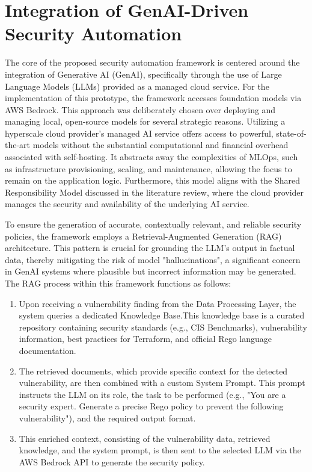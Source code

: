 

\section{Integration of GenAI-Driven Security Automation} %
\label{sub:Integration of GenAI-Driven Security Automation}

The core of the proposed security automation framework is centered around the integration of Generative AI (GenAI), specifically through the use of Large Language Models (LLMs) provided as a managed cloud service. For the implementation of this prototype, the framework accesses foundation models via AWS Bedrock. This approach was deliberately chosen over deploying and managing local, open-source models for several strategic reasons. Utilizing a hyperscale cloud provider's managed AI service offers access to powerful, state-of-the-art models without the substantial computational and financial overhead associated with self-hosting. It abstracts away the complexities of MLOps, such as infrastructure provisioning, scaling, and maintenance, allowing the focus to remain on the application logic. Furthermore, this model aligns with the Shared Responsibility Model discussed in the literature review, where the cloud provider manages the security and availability of the underlying AI service.

To ensure the generation of accurate, contextually relevant, and reliable security policies, the framework employs a Retrieval-Augmented Generation (RAG) architecture. This pattern is crucial for grounding the LLM's output in factual data, thereby mitigating the risk of model "hallucinations", a significant concern in GenAI systems where plausible but incorrect information may be generated. The RAG process within this framework functions as follows:
\begin{enumerate}
    \item Upon receiving a vulnerability finding from the Data Processing Layer, the system queries a dedicated Knowledge Base.This knowledge base is a curated repository containing security standards (e.g., CIS Benchmarks), vulnerability information, best practices for Terraform, and official Rego language documentation.
    \item The retrieved documents, which provide specific context for the detected vulnerability, are then combined with a custom System Prompt. This prompt instructs the LLM on its role, the task to be performed (e.g., "You are a security expert. Generate a precise Rego policy to prevent the following vulnerability"), and the required output format.
    \item This enriched context, consisting of the vulnerability data, retrieved knowledge, and the system prompt, is then sent to the selected LLM via the AWS Bedrock API to generate the security policy.
\end{enumerate}


